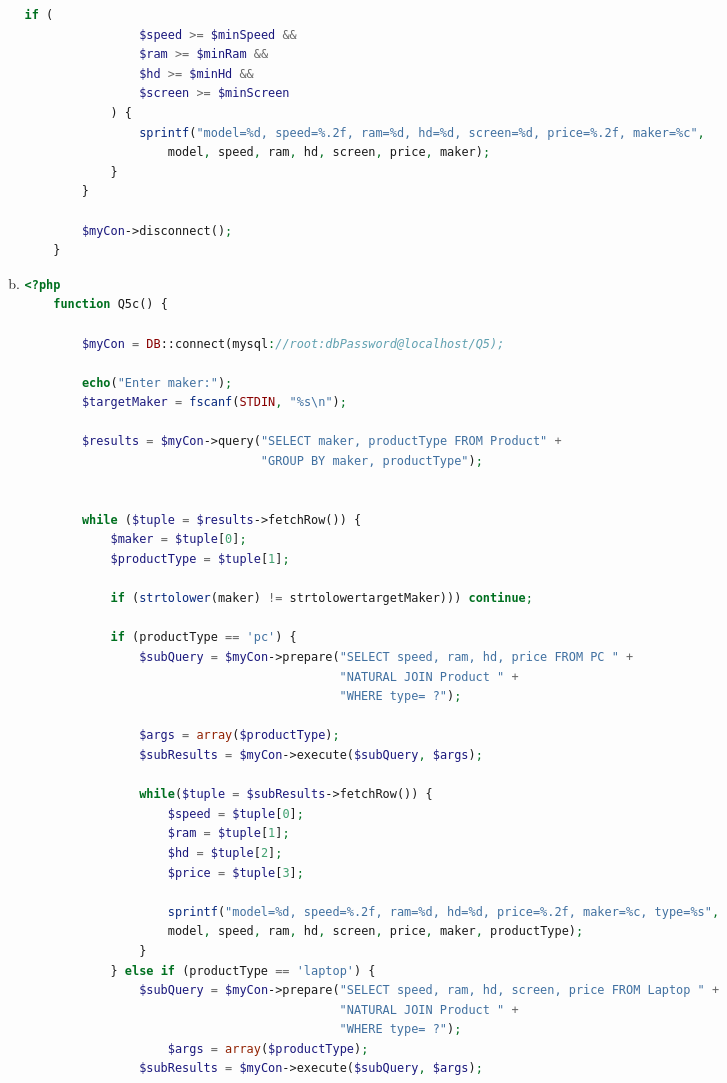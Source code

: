 \documentclass[12pt]{article}
\begin{document}
\begin{enumerate}[1.]
\begin{enumerate}[a)]
\begin{lstlisting}[language=PHP]
            if (
                $speed >= $minSpeed &&
                $ram >= $minRam &&
                $hd >= $minHd &&
                $screen >= $minScreen
            ) {
                sprintf("model=%d, speed=%.2f, ram=%d, hd=%d, screen=%d, price=%.2f, maker=%c",
                    model, speed, ram, hd, screen, price, maker);
            }
        }

        $myCon->disconnect();
    }
    \end{lstlisting}

        \item

    \begin{lstlisting}[language=PHP]
    <?php
    function Q5c() {

        $myCon = DB::connect(mysql://root:dbPassword@localhost/Q5);

        echo("Enter maker:");
        $targetMaker = fscanf(STDIN, "%s\n");

        $results = $myCon->query("SELECT maker, productType FROM Product" +
                                 "GROUP BY maker, productType");


        while ($tuple = $results->fetchRow()) {
            $maker = $tuple[0];
            $productType = $tuple[1];

            if (strtolower(maker) != strtolowertargetMaker))) continue;

            if (productType == 'pc') {
                $subQuery = $myCon->prepare("SELECT speed, ram, hd, price FROM PC " +
                                            "NATURAL JOIN Product " +
                                            "WHERE type= ?");

                $args = array($productType);
                $subResults = $myCon->execute($subQuery, $args);

                while($tuple = $subResults->fetchRow()) {
                    $speed = $tuple[0];
                    $ram = $tuple[1];
                    $hd = $tuple[2];
                    $price = $tuple[3];

                    sprintf("model=%d, speed=%.2f, ram=%d, hd=%d, price=%.2f, maker=%c, type=%s",
                    model, speed, ram, hd, screen, price, maker, productType);
                }
            } else if (productType == 'laptop') {
                $subQuery = $myCon->prepare("SELECT speed, ram, hd, screen, price FROM Laptop " +
                                            "NATURAL JOIN Product " +
                                            "WHERE type= ?");
                    $args = array($productType);
                $subResults = $myCon->execute($subQuery, $args);


\end{lstlisting}
\end{enumerate}
\end{enumerate}
\end{document}
